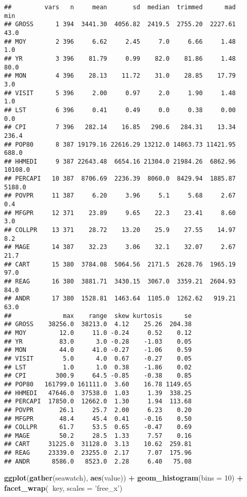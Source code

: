 \documentclass[]{article}
\newenvironment{Shaded}{\begin{snugshade}}{\end{snugshade}}
\newcommand{\KeywordTok}[1]{\textcolor[rgb]{0.13,0.29,0.53}{\textbf{#1}}}
\newcommand{\DataTypeTok}[1]{\textcolor[rgb]{0.13,0.29,0.53}{#1}}
\newcommand{\DecValTok}[1]{\textcolor[rgb]{0.00,0.00,0.81}{#1}}
\newcommand{\StringTok}[1]{\textcolor[rgb]{0.31,0.60,0.02}{#1}}
\newcommand{\OperatorTok}[1]{\textcolor[rgb]{0.81,0.36,0.00}{\textbf{#1}}}
\newcommand{\NormalTok}[1]{#1}
\begin{document}
\begin{verbatim}
##         vars   n     mean       sd  median  trimmed      mad     min
## GROSS      1 394  3441.30  4056.82  2419.5  2755.20  2227.61    43.0
## MOY        2 396     6.62     2.45     7.0     6.66     1.48     1.0
## YR         3 396    81.79     0.99    82.0    81.86     1.48    80.0
## MON        4 396    28.13    11.72    31.0    28.85    17.79     3.0
## VISIT      5 396     2.00     0.97     2.0     1.90     1.48     1.0
## LST        6 396     0.41     0.49     0.0     0.38     0.00     0.0
## CPI        7 396   282.14    16.85   290.6   284.31    13.34   236.4
## POP80      8 387 19179.16 22616.29 13212.0 14863.73 11421.95   688.0
## HHMEDI     9 387 22643.48  6654.16 21304.0 21984.26  6862.96 10108.0
## PERCAPI   10 387  8706.69  2236.39  8060.0  8429.94  1885.87  5188.0
## POVPR     11 387     6.20     3.96     5.1     5.68     2.67     0.4
## MFGPR     12 371    23.89     9.65    22.3    23.41     8.60     3.0
## COLLPR    13 371    28.72    13.20    25.9    27.55    14.97     8.2
## MAGE      14 387    32.23     3.06    32.1    32.07     2.67    21.7
## CART      15 380  3784.08  5064.56  2171.5  2628.76  1965.19    97.0
## REAG      16 380  3881.71  3430.15  3067.0  3359.21  2604.93    84.0
## ANDR      17 380  1528.81  1463.64  1105.0  1262.62   919.21    63.0
##              max    range  skew kurtosis      se
## GROSS    38256.0  38213.0  4.12    25.26  204.38
## MOY         12.0     11.0 -0.24     0.52    0.12
## YR          83.0      3.0 -0.28    -1.03    0.05
## MON         44.0     41.0 -0.27    -1.06    0.59
## VISIT        5.0      4.0  0.67    -0.27    0.05
## LST          1.0      1.0  0.38    -1.86    0.02
## CPI        300.9     64.5 -0.85    -0.38    0.85
## POP80   161799.0 161111.0  3.60    16.78 1149.65
## HHMEDI   47646.0  37538.0  1.03     1.39  338.25
## PERCAPI  17850.0  12662.0  1.30     1.94  113.68
## POVPR       26.1     25.7  2.00     6.23    0.20
## MFGPR       48.4     45.4  0.41    -0.16    0.50
## COLLPR      61.7     53.5  0.65    -0.47    0.69
## MAGE        50.2     28.5  1.33     7.57    0.16
## CART     31225.0  31128.0  3.13    10.62  259.81
## REAG     23339.0  23255.0  2.17     7.07  175.96
## ANDR      8586.0   8523.0  2.28     6.40   75.08
\end{verbatim}

\begin{Shaded}
\begin{Highlighting}[]
\KeywordTok{ggplot}\NormalTok{(}\KeywordTok{gather}\NormalTok{(seawatch), }\KeywordTok{aes}\NormalTok{(value)) }\OperatorTok{+}\StringTok{ }
\StringTok{    }\KeywordTok{geom_histogram}\NormalTok{(}\DataTypeTok{bins =} \DecValTok{10}\NormalTok{) }\OperatorTok{+}\StringTok{ }
\StringTok{    }\KeywordTok{facet_wrap}\NormalTok{(}\OperatorTok{~}\NormalTok{key, }\DataTypeTok{scales =} \StringTok{'free_x'}\NormalTok{)}
\end{Highlighting}
\end{Shaded}
\end{document}
